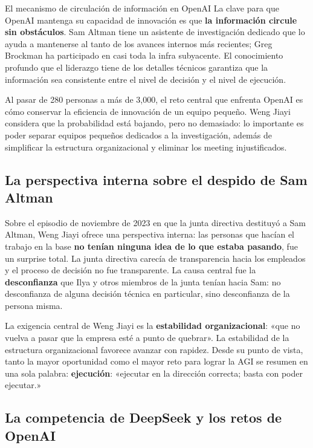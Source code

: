 \documentclass[a4paper]{article}
\begin{document}
\begin{knowledgebox}{El mecanismo de circulación de información en OpenAI}
La clave para que OpenAI mantenga su capacidad de innovación es que \textbf{la información circule sin obstáculos}. Sam Altman tiene un asistente de investigación dedicado que lo ayuda a mantenerse al tanto de los avances internos más recientes; Greg Brockman ha participado en casi toda la infra subyacente. El conocimiento profundo que el liderazgo tiene de los detalles técnicos garantiza que la información sea consistente entre el nivel de decisión y el nivel de ejecución.
\end{knowledgebox}

Al pasar de 280 personas a más de 3,000, el reto central que enfrenta OpenAI es cómo conservar la eficiencia de innovación de un equipo pequeño. Weng Jiayi considera que la probabilidad está bajando, pero no demasiado: lo importante es poder separar equipos pequeños dedicados a la investigación, además de simplificar la estructura organizacional y eliminar los meeting injustificados.

\subsection{La perspectiva interna sobre el despido de Sam Altman}

Sobre el episodio de noviembre de 2023 en que la junta directiva destituyó a Sam Altman, Weng Jiayi ofrece una perspectiva interna: las personas que hacían el trabajo en la base \textbf{no tenían ninguna idea de lo que estaba pasando}, fue un surprise total. La junta directiva carecía de transparencia hacia los empleados y el proceso de decisión no fue transparente. La causa central fue la \textbf{desconfianza} que Ilya y otros miembros de la junta tenían hacia Sam: no desconfianza de alguna decisión técnica en particular, sino desconfianza de la persona misma.

La exigencia central de Weng Jiayi es la \textbf{estabilidad organizacional}: «que no vuelva a pasar que la empresa esté a punto de quebrar». La estabilidad de la estructura organizacional favorece avanzar con rapidez. Desde su punto de vista, tanto la mayor oportunidad como el mayor reto para lograr la AGI se resumen en una sola palabra: \textbf{ejecución}: «ejecutar en la dirección correcta; basta con poder ejecutar.»

\subsection{La competencia de DeepSeek y los retos de OpenAI}
\end{document}
